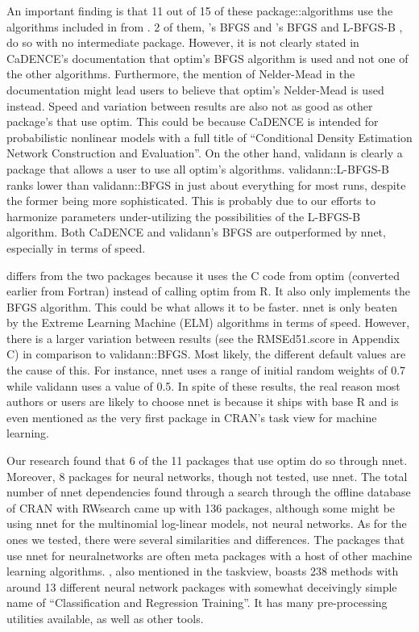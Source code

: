 An important finding is that 11 out of 15 of these package::algorithms
use the algorithms included in  from . 2 of
them, 's BFGS \citep{R-CaDENCE} and
's BFGS and L-BFGS-B \citep{R-validann}, do so with no
intermediate package. However, it is not clearly stated in CaDENCE's
documentation that optim's BFGS algorithm is used and not one of the
other algorithms. Furthermore, the mention of Nelder-Mead in the
documentation might lead users to believe that optim's Nelder-Mead is
used instead. Speed and variation between results are also not as good
as other package's that use optim. This could be because CaDENCE is
intended for probabilistic nonlinear models with a full title of
``Conditional Density Estimation Network Construction and Evaluation''.
On the other hand, validann is clearly a package that allows a user to
use all optim's algorithms. validann::L-BFGS-B ranks lower than
validann::BFGS in just about everything for most runs, despite the
former being more sophisticated. This is probably due to our efforts to
harmonize parameters under-utilizing the possibilities of the L-BFGS-B
algorithm. Both CaDENCE and validann's BFGS are outperformed by nnet,
especially in terms of speed.

 \citep{R-nnet} differs from the two packages because it
uses the C code from optim (converted earlier from Fortran) instead of
calling optim from R. It also only implements the BFGS algorithm. This
could be what allows it to be faster. nnet is only beaten by the Extreme
Learning Machine (ELM) algorithms in terms of speed. However, there is a
larger variation between results (see the RMSEd51.score in Appendix C)
in comparison to validann::BFGS. Most likely, the different default
values are the cause of this. For instance, nnet uses a range of initial
random weights of 0.7 while validann uses a value of 0.5. In spite of
these results, the real reason most authors or users are likely to
choose nnet is because it ships with base R and is even mentioned as the
very first package in CRAN's task view for machine learning.

Our research found that 6 of the 11 packages that use optim do so
through nnet. Moreover, 8 packages for neural networks, though not
tested, use nnet. The total number of nnet dependencies found through a
search through the offline database of CRAN with RWsearch came up with
136 packages, although some might be using nnet for the multinomial
log-linear models, not neural networks. As for the ones we tested, there
were several similarities and differences. The packages that use nnet
for neuralnetworks are often meta packages with a host of other machine
learning algorithms.  \citep{R-caret}, also mentioned in
the taskview, boasts 238 methods with around 13 different neural network
packages with somewhat deceivingly simple name of ``Classification and
Regression Training''. It has many pre-processing utilities available,
as well as other tools.

